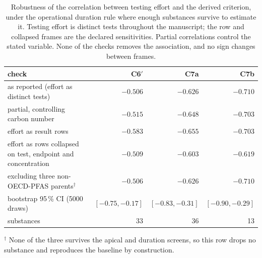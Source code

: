 \begin{table}[htbp]\centering\scriptsize\setlength{\tabcolsep}{2.4pt}
\caption{Robustness of the correlation between testing effort and the derived criterion, under the operational duration rule where enough substances survive to estimate it. Testing effort is distinct tests throughout the manuscript; the row and collapsed frames are the declared sensitivities. Partial correlations control the stated variable. None of the checks removes the association, and no sign changes between frames.}
\label{tab:rob}
\begin{tabular}{@{}p{62mm} rrr@{}}\toprule
check & C6$'$ & C7a & C7b\\\midrule
as reported (effort as distinct tests) & $-0.506$ & $-0.626$ & $-0.710$\\
partial, controlling carbon number & $-0.515$ & $-0.648$ & $-0.703$\\
effort as result rows & $-0.583$ & $-0.655$ & $-0.703$\\
effort as rows collapsed on test, endpoint and concentration & $-0.509$ & $-0.603$ & $-0.619$\\
excluding three non-OECD-PFAS parents$^{\dagger}$ & $-0.506$ & $-0.626$ & $-0.710$\\
bootstrap 95\,\% CI (5000 draws) & $[-0.75,-0.17]$ & $[-0.83,-0.31]$ & $[-0.90,-0.29]$\\
substances & 33 & 36 & 13\\
\bottomrule\end{tabular}

\footnotesize $^{\dagger}$ None of the three survives the apical and duration screens, so this row drops no substance and reproduces the baseline by construction.
\end{table}
